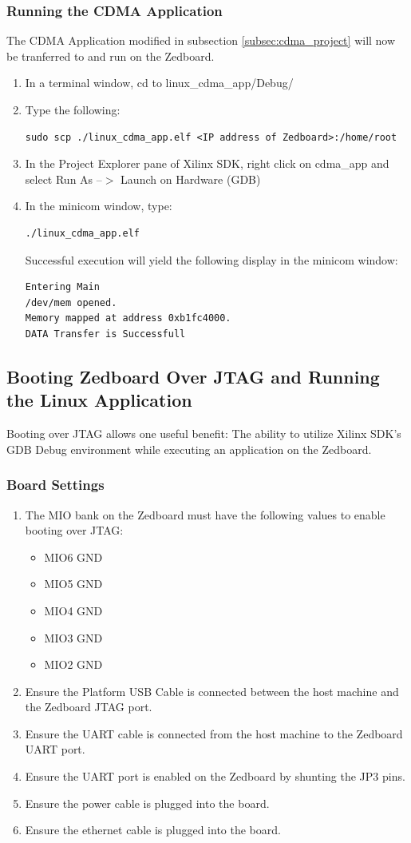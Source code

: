 \documentclass[12pt]{article}
\begin{document}
\subsubsection{Running the CDMA Application}
The CDMA Application modified in subsection \ref{subsec:cdma_project} will now be tranferred to and run on the Zedboard.
\begin{enumerate}
\item In a terminal window, cd to linux\_cdma\_app/Debug/
\item Type the following:
\begin{lstlisting}
sudo scp ./linux_cdma_app.elf <IP address of Zedboard>:/home/root
\end{lstlisting}
\item In the Project Explorer pane of Xilinx SDK, right click on cdma\_app and select Run As --$>$ Launch on Hardware (GDB)
\item In the minicom window, type:
\begin{lstlisting}
./linux_cdma_app.elf
\end{lstlisting}
Successful execution will yield the following display in the minicom window:
\begin{lstlisting}
Entering Main
/dev/mem opened.
Memory mapped at address 0xb1fc4000.
DATA Transfer is Successfull
\end{lstlisting}
\end{enumerate}

\subsection{Booting Zedboard Over JTAG and Running the Linux Application}
Booting over JTAG allows one useful benefit: The ability to utilize Xilinx SDK's GDB Debug environment while executing an application on the Zedboard.

\subsubsection{Board Settings}
\begin{enumerate}
\item The MIO bank on the Zedboard must have the following values to enable booting over JTAG:
\begin{itemize}
\item MIO6 GND
\item MIO5 GND
\item MIO4 GND
\item MIO3 GND
\item MIO2 GND
\end{itemize}
\item Ensure the Platform USB Cable is connected between the host machine and the Zedboard JTAG port.
\item Ensure the UART cable is connected from the host machine to the Zedboard UART port.
\item Ensure the UART port is enabled on the Zedboard by shunting the JP3 pins.
\item Ensure the power cable is plugged into the board.
\item Ensure the ethernet cable is plugged into the board.
\end{enumerate}
\end{document}

